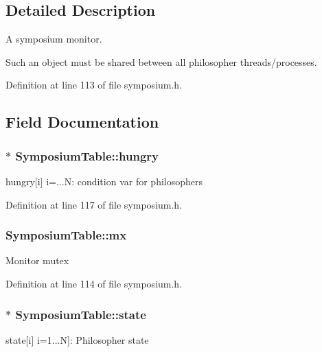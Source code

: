 \subsection{Detailed Description}
A symposium monitor. 

Such an object must be shared between all philosopher threads/processes. 

Definition at line 113 of file symposium.\-h.



\subsection{Field Documentation}
\hypertarget{structSymposiumTable_a6daa1fdbfe8e836e72bfd6953bc91f6e}{
\subsubsection[{hungry}]{$\ast$ Symposium\-Table\-::hungry}}\label{structSymposiumTable_a6daa1fdbfe8e836e72bfd6953bc91f6e}
hungry\mbox{[}i\mbox{]} i=...N\-: condition var for philosophers 

Definition at line 117 of file symposium.\-h.

\hypertarget{structSymposiumTable_a8c36f26f523e6b2f99f6e70fff098de8}{
\subsubsection[{mx}]{ Symposium\-Table\-::mx}}\label{structSymposiumTable_a8c36f26f523e6b2f99f6e70fff098de8}
Monitor mutex 

Definition at line 114 of file symposium.\-h.

\hypertarget{structSymposiumTable_a70507f28df670d0db2e59fc65309af08}{
\subsubsection[{state}]{$\ast$ Symposium\-Table\-::state}}\label{structSymposiumTable_a70507f28df670d0db2e59fc65309af08}
state\mbox{[}i\mbox{]} i=1...N\mbox{]}\-: Philosopher state 

